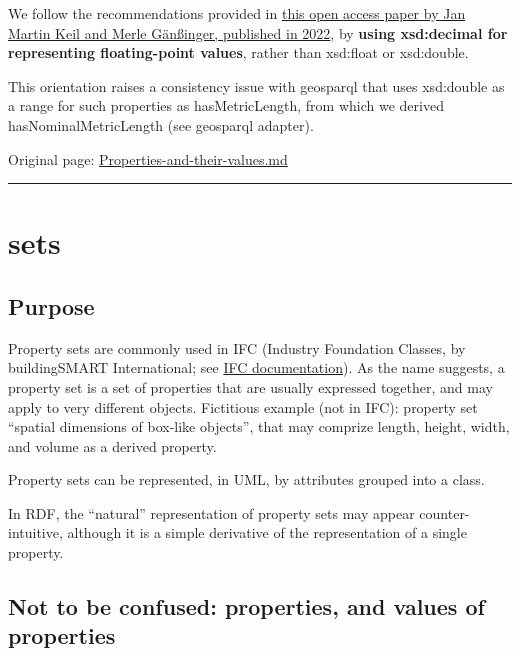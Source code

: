 \documentclass[
  11pt,
]{article}
\begin{document}
We follow the recommendations provided in
\href{https://link.springer.com/chapter/10.1007/978-3-031-06981-9_10}{this
open access paper by Jan Martin Keil and Merle Gänßinger, published in
2022}, by \textbf{using xsd:decimal for representing floating-point
values}, rather than xsd:float or xsd:double.

This orientation raises a consistency issue with geosparql that uses
xsd:double as a range for such properties as hasMetricLength, from which
we derived hasNominalMetricLength (see geosparql adapter).

Original page:
\href{https://github.com/UICrail/CDM-RSM/wiki/Properties-and-their-values}{Properties-and-their-values.md}

\begin{center}\rule{0.5\linewidth}{0.5pt}\end{center}

\hypertarget{sets}{%
\section{sets}\label{sets}}

\hypertarget{purpose-4}{%
\subsection{Purpose}\label{purpose-4}}

Property sets are commonly used in IFC (Industry Foundation Classes, by
buildingSMART International; see
\href{https://ifc43-docs.standards.buildingsmart.org/}{IFC
documentation}). As the name suggests, a property set is a set of
properties that are usually expressed together, and may apply to very
different objects. Fictitious example (not in IFC): property set
``spatial dimensions of box-like objects'', that may comprize length,
height, width, and volume as a derived property.

Property sets can be represented, in UML, by attributes grouped into a
class.

In RDF, the ``natural'' representation of property sets may appear
counter-intuitive, although it is a simple derivative of the
representation of a single property.

\hypertarget{not-to-be-confused-properties-and-values-of-properties}{%
\subsection{Not to be confused: properties, and values of
properties}\label{not-to-be-confused-properties-and-values-of-properties}}
\end{document}
